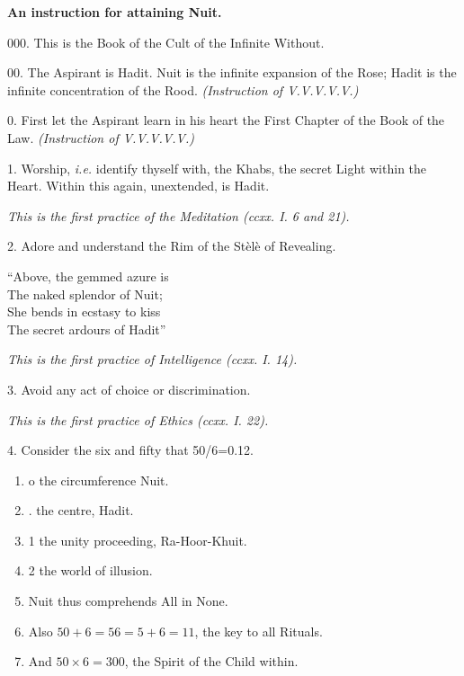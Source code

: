 
\textbf{An instruction for attaining Nuit.}

000. This is the Book of the Cult of the Infinite Without.

00. The Aspirant is Hadit. Nuit is the infinite expansion of the Rose; Hadit is the infinite concentration of the Rood. \textit{(Instruction of V.V.V.V.V.)}

0. First let the Aspirant learn in his heart the First Chapter of the Book of the Law. \textit{(Instruction of V.V.V.V.V.)}

1. Worship, \textit{i.e.} identify thyself with, the Khabs, the secret Light within the Heart. Within this again, unextended, is Hadit.

\textit{This is the first practice of the Meditation (ccxx. I. 6 and 21).}

2. Adore and understand the Rim of the St\`{e}l\`{e} of Revealing.
\begin{quoting}[indentfirst=false]
\enquote{Above, the gemmed azure is \\
The naked splendor of Nuit; \\
She bends in ecstasy to kiss \\
The secret ardours of Hadit}
\end{quoting}

\textit{This is the first practice of Intelligence (ccxx. I. 14).}

3. Avoid any act of choice or discrimination.

\textit{This is the first practice of Ethics (ccxx. I. 22).}

4. Consider the six and fifty that 50/6=0.12. \begin{enumerate}[label={}]
\item o the circumference Nuit.
\item . the centre, Hadit.
\item 1 the unity proceeding, Ra-Hoor-Khuit.
\item 2 the world of illusion.
\item Nuit thus comprehends All in None.
\item Also $50 + 6 = 56 = 5 + 6 = 11$, the key to all Rituals.
\item And $50 \times 6 = 300$, the Spirit of the Child within.
\end{enumerate}

